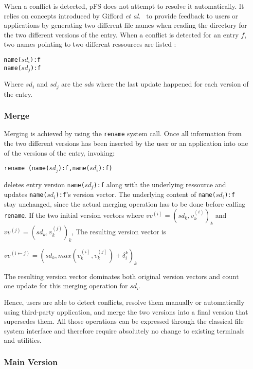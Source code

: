 \documentclass[letterpaper,twocolumn,10pt]{article}
\begin{document}
When a conflict is detected, pFS does not attempt to resolve it
automatically. It relies on concepts introduced by Gifford 
\emph{et al.}~\cite{Gifford1988} 
to provide feedback to users or applications by generating two
different file names when reading the directory for the two different
versions of the entry. When a conflict is detected for an entry $f$,
two names pointing to two different ressources are listed : 
\begin{center}
{\tt name($sd_{i}$):f} \\
{\tt name($sd_{j}$):f}
\end{center}
Where $sd_{i}$ and $sd_{j}$ are the $sd$s where
the last update happened for each version of the entry.

\subsubsection{Merge}

Merging is achieved by using the {\tt rename} system call. Once all
information from the two different versions has been inserted by the
user or an application into one of the versions of the entry,
invoking:
\begin{center} 
{\tt rename (name($sd_{j}$):f,name($sd_{i}$):f)}
\end{center}
 deletes entry version {\tt name($sd_{j}$):f} along with the
 underlying ressource and updates 
{\tt name($sd_{i}$):f}'s version vector. The underlying content of 
{\tt name($sd_{i}$):f} stay unchanged, since the actual merging
operation has to be done before calling {\tt rename}.
If the two initial version vectors where
$vv^{(i)}=(sd_{k},v_{k}^{(i)})_{k}$ and
  $vv^{(j)}=(sd_{k},v_{k}^{(j)})_{k}$, The resulting version
vector is 
\begin{center}
$vv^{(i \leftarrow j)}=(sd_{k},
max(v_{k}^{(i)},v_{k}^{(j)}) + \delta _{i}^{k})_{k}$
\end{center}
The resulting version vector dominates both original version vectors
and count one update for this merging operation for $sd_{i}$.

Hence, users are able to detect conflicts, resolve them manually or
automatically using third-party application, and merge the two
versions into a final version that supersedes them. All those
operations can be expressed through the classical file
system interface and therefore require absolutely no change to
existing terminals and utilities.

\subsubsection{Main Version}
\end{document}
